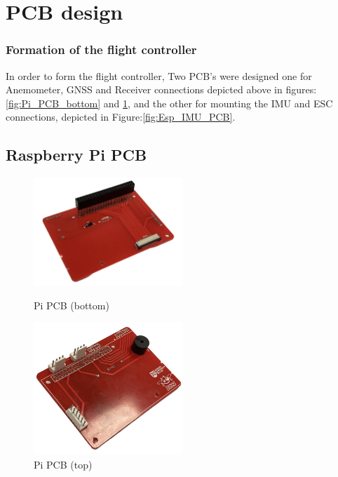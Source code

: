 \documentclass{report}
\begin{document}
\section{PCB design}\label{PCB_section}
\subsubsection*{Formation of the flight controller}
In order to form the flight controller, Two PCB's were designed one for
Anemometer, GNSS and Receiver connections depicted above in
figures:\ref{fig:Pi_PCB_bottom} and \ref{fig:Pi_PCB_top}, and the other for
mounting the IMU and ESC connections, depicted in Figure:\ref{fig:Esp_IMU_PCB}.
\subsection{Raspberry Pi PCB}
\begin{figure}[H]
  \begin{minipage}{0.5\textwidth}
    \centering
    \includegraphics[width=0.5\textwidth]{Pictures/Pi_PCB_bottom.png}
    \caption{Pi PCB (bottom)}
    \label{fig:Pi_PCB_bottom}
  \end{minipage}
  \begin{minipage}{0.5\textwidth}
    \centering
    \includegraphics[width=0.5\textwidth]{Pictures/Pi_PCB_top.png}
    \caption{Pi PCB (top)}
    \label{fig:Pi_PCB_top}
  \end{minipage}
\end{figure}
\end{document}
